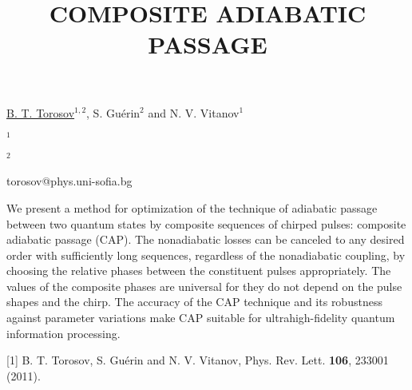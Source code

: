 \title{COMPOSITE ADIABATIC PASSAGE}

\underline{B. T. Torosov}$^{1,2}$, S. Gu\'{e}rin$^{2}$ and N. V. Vitanov$^{1}$

{\normalsize{

\vspace{-4mm} $^1$\unisofia

\vspace{-4mm} $^2$\dijon

\email torosov@phys.uni-sofia.bg}}

We present a method for optimization of the technique of adiabatic passage between two quantum states by composite sequences of chirped pulses: composite adiabatic passage (CAP). The nonadiabatic losses can be canceled to any desired order with sufficiently long sequences, regardless of the nonadiabatic coupling, by choosing the relative phases between the constituent pulses appropriately. The values of the composite phases are universal for they do not depend on the pulse shapes and the chirp. The accuracy of the CAP technique and its robustness against parameter variations make CAP suitable for ultrahigh-fidelity quantum information processing.

{\normalsize
[1] B. T. Torosov, S. Gu\'{e}rin and N. V. Vitanov, Phys. Rev. Lett. \textbf{106}, 233001 (2011).
}

\vspace{\baselineskip} 